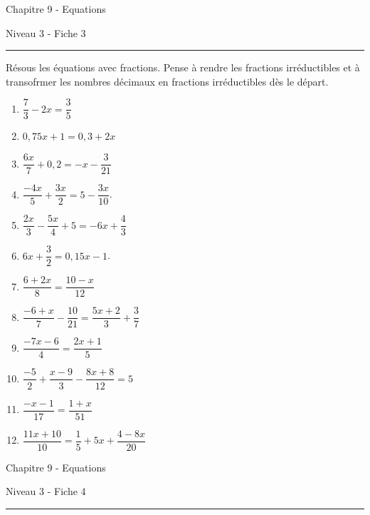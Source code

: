 \documentclass[12pt,parskip=half-, twoside=semi]{scrartcl}
\begin{document}
\newpage


\begin{center}
  \bfseries
  \begin{Huge}
    Chapitre 9 - Equations
  \end{Huge}
  \smallbreak
  \begin{large}
    Niveau 3  - Fiche 3
  \end{large}
  \smallbreak
  \rule[10pt]{.5\linewidth}{1 pt}
\end{center}
\setcounter{exercise}{0}

\begin{exercise}
  Résous les équations avec fractions. Pense à rendre les fractions irréductibles et à transofrmer les nombres décimaux en fractions irréductibles dès le départ.
  \begin{enumerate}[itemsep=0.4cm]
      \item $\dfrac{7}{3}-2 x=\dfrac{3}{5}$
      \item $0,75 x+1=0,3+2 x$
      \item $\dfrac{6 x}{7}+0,2=-x-\dfrac{3}{21}$
      \item $\dfrac{-4 x}{5}+\dfrac{3 x}{2}=5-\dfrac{3 x}{10}$.
      \item $\dfrac{2 x}{3}-\dfrac{5 x}{4}+5=-6 x+\dfrac{4}{3}$
      \item $6 x+\dfrac{3}{2}=0,15 x-1$.
      \item $\dfrac{6+2 x}{8}=\dfrac{10-x}{12}$
      \item $\dfrac{-6+x}{7}-\dfrac{10}{21}=\dfrac{5 x+2}{3}+\dfrac{3}{7}$
      \item $\dfrac{-7 x-6}{4}=\dfrac{2 x+1}{5}$
      \item $\dfrac{-5}{2}+\dfrac{x-9}{3}-\dfrac{8 x+8}{12}=5$
      \item $\dfrac{-x-1}{17}=\dfrac{1+x}{51}$
      \item $\dfrac{11 x+10}{10}=\dfrac{1}{5}+5 x+\dfrac{4-8 x}{20}$   
  \end{enumerate}
\end{exercise}


\newpage


\begin{center}
  \bfseries
  \begin{Huge}
    Chapitre 9 - Equations
  \end{Huge}
  \smallbreak
  \begin{large}
    Niveau 3  - Fiche 4
  \end{large}
  \smallbreak
  \rule[10pt]{.5\linewidth}{1 pt}
\end{center}
\setcounter{exercise}{0}
\end{document}
